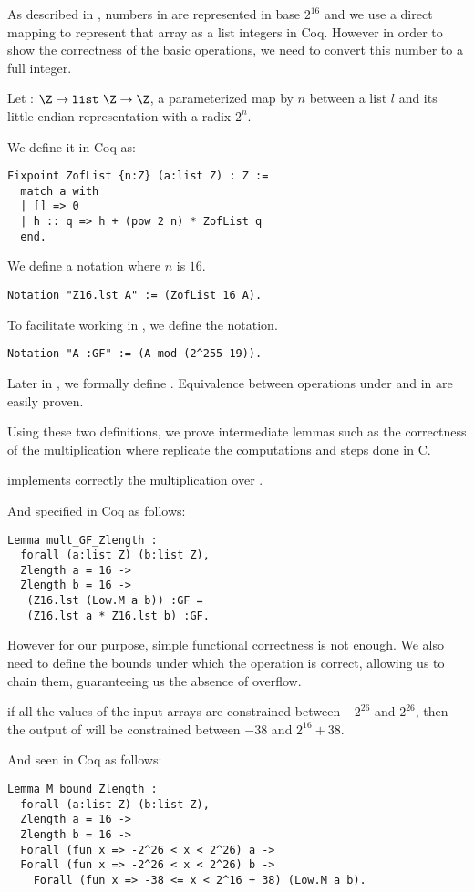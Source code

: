 As described in , numbers in  are represented
in base $2^{16}$ and we use a direct mapping to represent that array as a list
integers in Coq. However in order to show the correctness of the basic operations,
we need to convert this number to a full integer.
\begin{dfn}
Let  : $\Z \rightarrow \texttt{list}~\Z \rightarrow \Z$,
a parameterized map by $n$ between a list $l$ and its little endian representation
with a radix $2^n$.
\end{dfn}
We define it in Coq as:
\begin{lstlisting}[language=Coq]
Fixpoint ZofList {n:Z} (a:list Z) : Z :=
  match a with
  | [] => 0
  | h :: q => h + (pow 2 n) * ZofList q
  end.
\end{lstlisting}
We define a notation where $n$ is $16$.
\begin{lstlisting}[language=Coq]
Notation "Z16.lst A" := (ZofList 16 A).
\end{lstlisting}
To facilitate working in \Zfield, we define the  notation.
\begin{lstlisting}[language=Coq]
Notation "A :GF" := (A mod (2^255-19)).
\end{lstlisting}
Later in , we formally define \F{\p}.
Equivalence between operations under  and in \F{\p} are easily proven.

Using these two definitions, we prove intermediate lemmas such as the correctness of the
multiplication  where  replicate the computations and steps done in C.
\begin{lemma}
  \label{lemma:mult_correct}
   implements correctly the multiplication over \Zfield.
\end{lemma}
And specified in Coq as follows:
\begin{lstlisting}[language=Coq]
Lemma mult_GF_Zlength :
  forall (a:list Z) (b:list Z),
  Zlength a = 16 ->
  Zlength b = 16 ->
   (Z16.lst (Low.M a b)) :GF =
   (Z16.lst a * Z16.lst b) :GF.
\end{lstlisting}

However for our purpose, simple functional correctness is not enough.
We also need to define the bounds under which the operation is correct,
allowing us to chain them, guaranteeing us the absence of overflow.

\begin{lemma}
  \label{lemma:mult_bounded}
  if all the values of the input arrays are constrained between $-2^{26}$ and $2^{26}$,
  then the output of  will be constrained between $-38$ and $2^{16} + 38$.
\end{lemma}
And seen in Coq as follows:
\begin{lstlisting}[language=Coq]
Lemma M_bound_Zlength :
  forall (a:list Z) (b:list Z),
  Zlength a = 16 ->
  Zlength b = 16 ->
  Forall (fun x => -2^26 < x < 2^26) a ->
  Forall (fun x => -2^26 < x < 2^26) b ->
    Forall (fun x => -38 <= x < 2^16 + 38) (Low.M a b).
\end{lstlisting}





